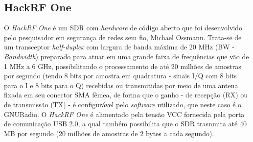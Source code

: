 \documentclass[
  12pt,				%
  openright,			%
  twoside,			%
  a4paper,			%
  english,			%
  french,				%
  spanish,			%
  brazil,				%
  ]{abntex2}
\begin{document}











\subsection*{HackRF One}


O \textit{HackRF One} é um SDR com \textit{hardware} de código aberto que foi desenvolvido pelo pesquisador em segurança de redes sem fio, Michael Ossmann. Trata-se de um transceptor \textit{half-duplex}
com largura de banda máxima de 20 MHz (BW - \textit{Bandwidth}) preparado para atuar em uma grande faixa de frequências que vão de 1 MHz a 6 GHz, possibilitando o processamento de até 20 milhões de amostras por
segundo (tendo 8 bits por amostra em quadratura - sinais I/Q com 8 bits para o I e 8 bits para o Q) recebidas ou transmitidas por meio de uma antena fixada em seu conector SMA fêmea, de
forma que o ganho - de recepção (RX) ou de transmissão (TX) - é configurável pelo \textit{software} utilizado, que neste caso é o GNURadio. O \textit{HackRF One} é alimentado pela tensão VCC fornecida
pela porta de comunicação USB 2.0, a qual também possibilita que o SDR trasnmita até 40 MB por segundo (20 milhões de amostras de 2 bytes a cada segundo).
\end{document}
